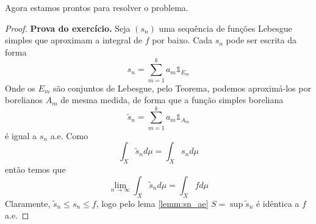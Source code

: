Agora estamos prontos para resolver o problema.
\begin{proof}
    \textbf{Prova do exercício.} Seja $(s_n)$ uma sequência de funções Lebesgue simples que aproximam
    a integral de $f$ por baixo. Cada $s_n$ pode ser escrita da forma
    $$s_n = \sum_{m=1}^{k} a_m \mathds{1}_{E_m}$$
    Onde os $E_m$ são conjuntos de Lebesgue, pelo Teorema, podemos aproximá-los por borelianos $A_m$ de mesma medida,
    de forma que a função simples boreliana 
    $$\tilde{s}_n = \sum_{m=1}^{k} a_m \mathds{1}_{A_m}$$
    é igual a $s_n$ a.e. Como
    $$\int_X \tilde{s}_n d\mu = \int_X s_n d\mu$$
    então temos que
    $$\lim_{n\to\infty} \int_X \tilde{s}_n d\mu = \int_X fd\mu$$
    Claramente, $\tilde{s}_n \leq s_n \leq f$, logo pelo lema \ref{lemm:sn_ae} $S = \sup \tilde{s}_n$ é idêntica
    a $f$ a.e. 
\end{proof}

